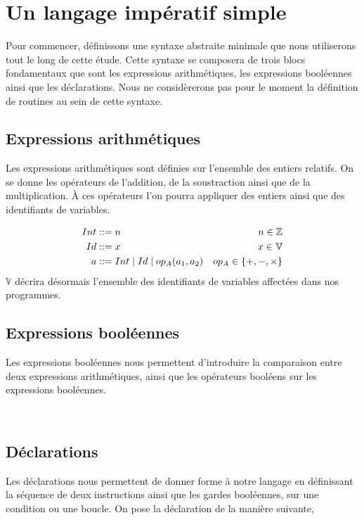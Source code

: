 \documentclass[a4paper, 10pt]{article}
\begin{document}
\section{Un langage impératif simple}
Pour commencer, définissons une syntaxe abstraite minimale que nous utiliserons tout le long de cette étude.
Cette syntaxe se composera de trois blocs fondamentaux que sont les expressions arithmétiques, les expressions
booléennes ainsi que les déclarations. Nous ne considèrerons pas pour le moment la définition de routines au sein de cette syntaxe.

\subsection{Expressions arithmétiques}
Les expressions arithmétiques sont définies sur l'ensemble des entiers relatifs. On se donne les opérateurs
de l'addition, de la soustraction ainsi que de la multiplication. À ces opérateurs l'on pourra appliquer des
entiers ainsi que des identifiants de variables.

\begin{align*}
  Int   & ::= n                               & n \in \mathbb{Z}          \\
  Id    & ::= x	  							  & x \in \mathbb{V}          \\
  a & ::= Int \mid Id \mid op_A(a_1, a_2) & op_A \in \{+, -, \times\}
\end{align*}
$\mathbb{V}$ décrira désormais l'ensemble des identifiants de variables affectées dans nos programmes. 
\subsection{Expressions booléennes}
Les expressions booléennes nous permettent d'introduire la comparaison entre deux expressions arithmétiques,
ainsi que les opérateurs booléens sur les expressions booléennes.

\begin{dtype}{\boolexp}
  \\
\end{dtype}

\subsection{Déclarations}
Les déclarations nous permettent de donner forme à notre langage en définissant la séquence de deux instructions ainsi
que les gardes booléennes, sur une condition ou une boucle. On pose la déclaration de la manière suivante,
\end{document}
